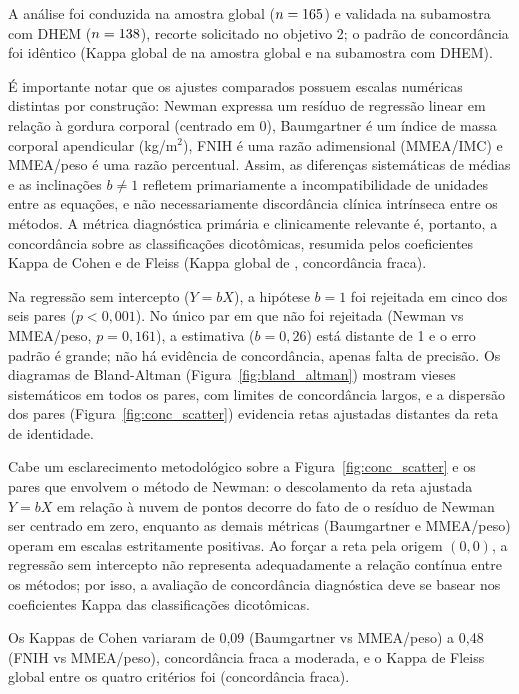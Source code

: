 \documentclass[11pt,a4paper]{article}
\begin{document}
A análise foi conduzida na amostra global ($n = 165{}$) e validada na
subamostra com DHEM ($n = 138{}$), recorte solicitado no objetivo 2;
o padrão de concordância foi idêntico (Kappa global de \KappaFleiss{} na amostra
global e \KappaFleissDHEM{} na subamostra com DHEM).

É importante notar que os ajustes comparados possuem escalas numéricas distintas
por construção: Newman expressa um resíduo de regressão linear em relação à
gordura corporal (centrado em 0), Baumgartner é um índice de massa corporal
apendicular (kg/m$^2$), FNIH é uma razão adimensional (MMEA/IMC) e MMEA/peso é
uma razão percentual. Assim, as diferenças sistemáticas de médias e as
inclinações $b \neq 1$ refletem primariamente a incompatibilidade de unidades
entre as equações, e não necessariamente discordância clínica intrínseca entre
os métodos. A métrica diagnóstica primária e clinicamente relevante é,
portanto, a concordância sobre as classificações dicotômicas, resumida pelos
coeficientes Kappa de Cohen e de Fleiss (Kappa global de \KappaFleiss{},
concordância fraca).

Na regressão sem intercepto ($Y = bX$), a hipótese $b = 1$ foi rejeitada em
cinco dos seis pares ($p < 0{,}001$). No único par em que não foi rejeitada
(Newman vs MMEA/peso, $p = 0{,}161$), a estimativa ($b = 0{,}26$) está distante
de 1 e o erro padrão é grande; não há evidência de concordância, apenas falta
de precisão. Os diagramas de Bland-Altman
(Figura~\ref{fig:bland_altman}) mostram vieses sistemáticos em todos os pares,
com limites de concordância largos, e a dispersão dos pares
(Figura~\ref{fig:conc_scatter}) evidencia retas ajustadas distantes da reta de
identidade.

Cabe um esclarecimento metodológico sobre a Figura~\ref{fig:conc_scatter} e os
pares que envolvem o método de Newman: o descolamento da reta ajustada $Y = bX$
em relação à nuvem de pontos decorre do fato de o resíduo de Newman ser centrado
em zero, enquanto as demais métricas (Baumgartner e MMEA/peso) operam em
escalas estritamente positivas. Ao forçar a reta pela origem $(0,0)$, a
regressão sem intercepto não representa adequadamente a relação contínua entre
os métodos; por isso, a avaliação de concordância diagnóstica deve se basear
nos coeficientes Kappa das classificações dicotômicas.

Os Kappas de Cohen variaram de 0,09 (Baumgartner vs MMEA/peso) a 0,48
(FNIH vs MMEA/peso), concordância fraca a moderada, e o Kappa de Fleiss
global entre os quatro critérios foi \KappaFleiss{} (concordância fraca).
\end{document}
